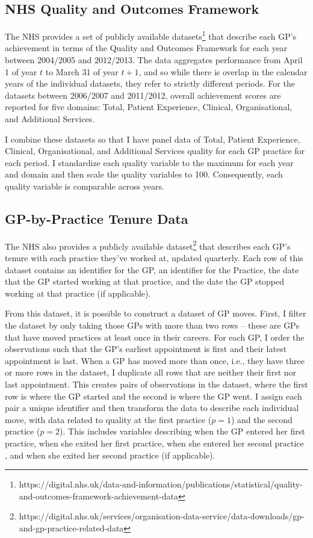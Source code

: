 \documentclass[11pt]{article}
\begin{document}
\subsection{NHS Quality and Outcomes Framework}
The NHS provides a set of publicly available datasets\footnote{https://digital.nhs.uk/data-and-information/publications/statistical/quality-and-outcomes-framework-achievement-data} that describe each GP's achievement in terms of the Quality and Outcomes Framework for each year between 2004/2005 and 2012/2013. The data aggregates performance from April 1 of year $t$ to March 31 of year $t+1$, and so while there is overlap in the calendar years of the individual datasets, they refer to strictly different periods. For the datasets between 2006/2007 and 2011/2012, overall achievement scores are reported for five domains: Total, Patient Experience, Clinical, Organisational, and Additional Services.

I combine these datasets so that I have panel data of Total, Patient Experience, Clinical, Organisational, and Additional Services quality for each GP practice for each period. I standardize each quality variable to the maximum for each year and domain and then scale the quality variables to 100. Consequently, each quality variable is comparable across years.


\subsection{GP-by-Practice Tenure Data}
The NHS also provides a publicly available dataset\footnote{https://digital.nhs.uk/services/organisation-data-service/data-downloads/gp-and-gp-practice-related-data} that describes each GP's tenure with each practice they've worked at, updated quarterly. Each row of this dataset contains an identifier for the GP, an identifier for the Practice, the date that the GP started working at that practice, and the date the GP stopped working at that practice (if applicable).



From this dataset, it is possible to construct a dataset of GP moves. First, I filter the dataset by only taking those GPs with more than two rows -- these are GPs that have moved practices at least once in their careers. For each GP, I order the observations such that the GP's earliest appointment is first and their latest appointment is last. When a GP has moved more than once, i.e., they have three or more rows in the dataset, I duplicate all rows that are neither their first nor last appointment. This creates pairs of observations in the dataset, where the first row is where the GP started and the second is where the GP went. I assign each pair a unique identifier and then transform the data to describe each individual move, with data related to quality at the first practice ($p=1$) and the second practice ($p=2$). This includes variables describing when the GP entered her first practice, when she exited her first practice, when she entered her second practice , and when she exited her second practice (if applicable).
\end{document}

